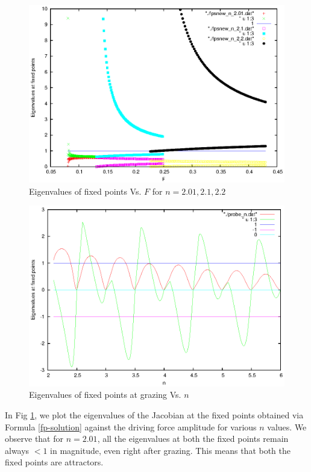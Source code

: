 \documentclass{book}
\renewcommand{\(}{\begin{columns}}
\renewcommand{\)}{\end{columns}}
\newcommand{\<}[1]{\begin{column}{#1}}
\renewcommand{\>}{\end{column}}
\begin{document}
\begin{figure}[!htp]
\begin{center}
\caption{Eigenvalues of fixed points Vs.  $F$ for $n=2.01,2.1,2.2$}
\label{fig-eigs-F}
\includegraphics[width=0.9\columnwidth]{fps_various_F}
\end{center}
\end{figure}

\begin{figure}[!htb]
\begin{center}
\caption{Eigenvalues of fixed points at grazing Vs. $n$}
\label{fig-eigs-n}
\includegraphics[width=0.9\columnwidth]{fps_various_n}
\end{center}
\end{figure}

In Fig \ref{fig-eigs-F}, we plot the eigenvalues of the Jacobian at the fixed 
points obtained via Formula \eqref{fp-solution} against the driving force 
amplitude for various $n$ values.  We observe that for $n=2.01$, all the 
eigenvalues at both the fixed points remain always $<1$ in magnitude, even right after grazing.  This 
means that both the fixed points are attractors.  
\end{document}
